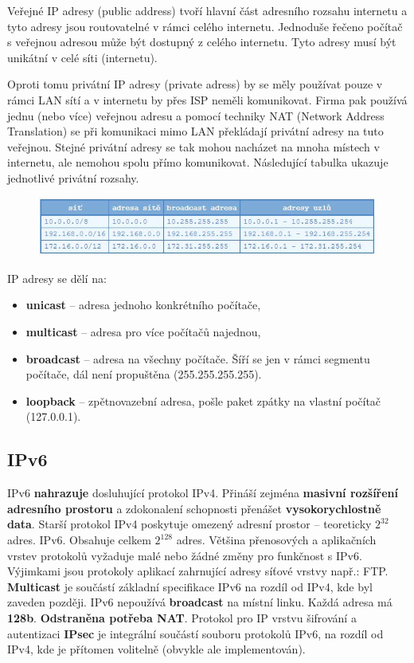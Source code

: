 Veřejné IP adresy (public address) tvoří hlavní část adresního rozsahu internetu a tyto adresy jsou routovatelné v rámci celého internetu. Jednoduše řečeno počítač s veřejnou adresou může být dostupný z celého internetu. Tyto adresy musí být unikátní v celé síti (internetu).

Oproti tomu privátní IP adresy (private adress) by se měly používat pouze v rámci LAN sítí a v internetu by přes ISP neměli komunikovat. Firma pak používá jednu (nebo více) veřejnou adresu a pomocí techniky NAT (Network Address Translation) se při komunikaci mimo LAN překládají privátní adresy na tuto veřejnou. Stejné privátní adresy se tak mohou nacházet na mnoha místech v internetu, ale nemohou spolu přímo komunikovat. Následující tabulka ukazuje jednotlivé privátní rozsahy.
\begin{figure}[H]
\centering
\includegraphics[width=1\textwidth]{assets/6_ip4}
\end{figure}

IP adresy se dělí na:
\begin{itemize}
\item \textbf{unicast} -- adresa jednoho konkrétního počítače,
\item \textbf{multicast} -- adresa pro více počítačů najednou,
\item \textbf{broadcast} -- adresa na všechny počítače. Šíří se jen v rámci segmentu počítače, dál není propuštěna (255.255.255.255).
\item \textbf{loopback} -- zpětnovazební adresa, pošle paket zpátky na vlastní počítač (127.0.0.1).
\end{itemize}

\subsection{IPv6}
IPv6 \textbf{nahrazuje} dosluhující protokol IPv4. Přináší zejména \textbf{masivní rozšíření adresního prostoru} a zdokonalení schopnosti přenášet \textbf{vysokorychlostně data}. Starší protokol IPv4 poskytuje omezený adresní prostor – teoreticky $2^{32}$ adres. IPv6. Obsahuje celkem $2^{128}$ adres. Většina přenosových a aplikačních vrstev protokolů vyžaduje malé nebo žádné změny pro funkčnost s IPv6. Výjimkami jsou protokoly aplikací zahrnující adresy síťové vrstvy např.: FTP. \textbf{Multicast} je součástí základní specifikace IPv6 na rozdíl od IPv4, kde byl zaveden později. IPv6 nepoužívá \textbf{broadcast} na místní linku. Každá adresa má \textbf{128b}. \textbf{Odstraněna potřeba NAT}. Protokol pro IP vrstvu šifrování a autentizaci \textbf{IPsec} je integrální součástí souboru protokolů IPv6, na rozdíl od IPv4, kde je přítomen volitelně (obvykle ale implementován).

